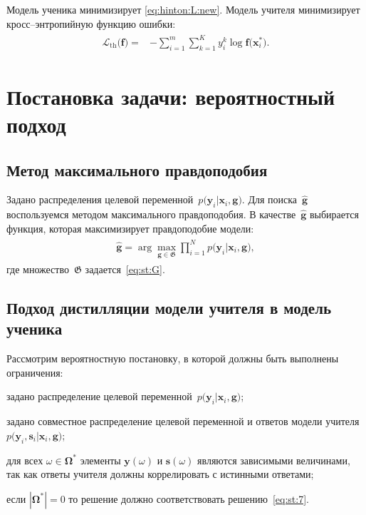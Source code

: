 \documentclass[12pt]{a&t}
\begin{document}
Модель ученика минимизирует \eqref{eq:hinton:L:new}. Модель учителя минимизирует кросс--энтропийную функцию ошибки:
\begin{gather}
\label{eq:hinton.2}
\begin{aligned}
   \mathcal{L}_\text{th}\bigr(\mathbf{f}\bigr) = &-\sum_{i=1}^{m}{{\sum_{k=1}^{K}y^k_i\log\mathbf{f}\bigr(\mathbf{x}^*_i\bigr)}}.
   \end{aligned}
\end{gather}

\section{Постановка задачи: вероятностный подход}

\subsection{Метод максимального правдоподобия}
Задано распределения целевой переменной~$p\bigr(\mathbf{y}_i|\mathbf{x}_i, \mathbf{g}\bigr)$.
Для поиска~$\hat{\mathbf{g}}$ воспользуемся методом максимального правдоподобия. В качестве~$\hat{\mathbf{g}}$ выбирается функция, которая максимизирует правдоподобие модели:
\begin{gather}
\label{eq:st:7}
\begin{aligned}
\hat{\mathbf{g}} = \arg\max_{\mathbf{g}\in \mathfrak{G}} \prod_{i=1}^{N}p\bigr(\mathbf{y}_{i}|\mathbf{x}_i, \mathbf{g}\bigr),
\end{aligned}
\end{gather}
где множество~$\mathfrak{G}$ задается~\eqref{eq:st:G}.
\subsection{Подход дистилляции модели учителя в модель ученика}
Рассмотрим вероятностную постановку, в которой должны быть выполнены ограничения:
\begin{enumlist}
	\item задано распределение целевой переменной~$p\bigr(\mathbf{y}_i|\mathbf{x}_i, \mathbf{g}\bigr)$;
	\item задано совместное распределение целевой переменной и ответов модели учителя~$p\bigr(\mathbf{y}_i, \mathbf{s}_i|\mathbf{x}_i, \mathbf{g}\bigr)$;
	\item для всех $\omega \in \bm{\Omega}^*$ элементы $\mathbf{y}(\omega)$ и $\mathbf{s}(\omega)$ являются зависимыми величинами, так как ответы учителя должны коррелировать с истинными ответами;
	\item если $|\bm{\Omega}^*|=0$ то решение должно соответствовать решению~\eqref{eq:st:7}.
\end{enumlist}
\end{document}
